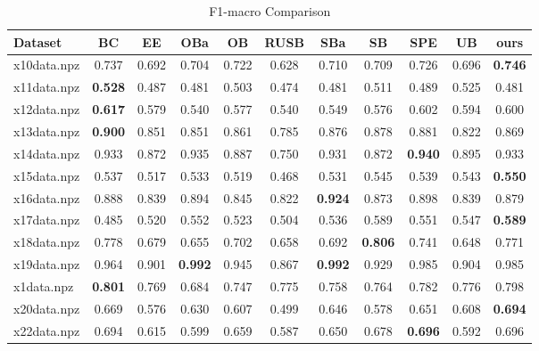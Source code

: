 \documentclass{article}
\begin{document}
\begin{table}[htbp]
\centering
\caption{F1-macro Comparison}
\begin{adjustbox}{width=\textwidth}
\label{tab:f1_macro_comparison}
\begin{tabular}{lcccccccccc}
\hline
\textbf{Dataset} & \textbf{BC} & \textbf{EE} & \textbf{OBa} & \textbf{OB} & \textbf{RUSB} & \textbf{SBa} & \textbf{SB} & \textbf{SPE} & \textbf{UB} & \textbf{ours} \\
\hline
x10data.npz & 0.737 & 0.692 & 0.704 & 0.722 & 0.628 & 0.710 & 0.709 & 0.726 & 0.696 & \cellcolor{graybg}\textbf{0.746} \\
x11data.npz & \cellcolor{graybg}\textbf{0.528} & 0.487 & 0.481 & 0.503 & 0.474 & 0.481 & 0.511 & 0.489 & 0.525 & 0.481 \\
x12data.npz & \cellcolor{graybg}\textbf{0.617} & 0.579 & 0.540 & 0.577 & 0.540 & 0.549 & 0.576 & 0.602 & 0.594 & 0.600 \\
x13data.npz & \cellcolor{graybg}\textbf{0.900} & 0.851 & 0.851 & 0.861 & 0.785 & 0.876 & 0.878 & 0.881 & 0.822 & 0.869 \\
x14data.npz & 0.933 & 0.872 & 0.935 & 0.887 & 0.750 & 0.931 & 0.872 & \cellcolor{graybg}\textbf{0.940} & 0.895 & 0.933 \\
x15data.npz & 0.537 & 0.517 & 0.533 & 0.519 & 0.468 & 0.531 & 0.545 & 0.539 & 0.543 & \cellcolor{graybg}\textbf{0.550} \\
x16data.npz & 0.888 & 0.839 & 0.894 & 0.845 & 0.822 & \cellcolor{graybg}\textbf{0.924} & 0.873 & 0.898 & 0.839 & 0.879 \\
x17data.npz & 0.485 & 0.520 & 0.552 & 0.523 & 0.504 & 0.536 & 0.589 & 0.551 & 0.547 & \cellcolor{graybg}\textbf{0.589} \\
x18data.npz & 0.778 & 0.679 & 0.655 & 0.702 & 0.658 & 0.692 & \cellcolor{graybg}\textbf{0.806} & 0.741 & 0.648 & 0.771 \\
x19data.npz & 0.964 & 0.901 & \cellcolor{graybg}\textbf{0.992} & 0.945 & 0.867 & \cellcolor{graybg}\textbf{0.992} & 0.929 & 0.985 & 0.904 & 0.985 \\
x1data.npz & \cellcolor{graybg}\textbf{0.801} & 0.769 & 0.684 & 0.747 & 0.775 & 0.758 & 0.764 & 0.782 & 0.776 & 0.798 \\
x20data.npz & 0.669 & 0.576 & 0.630 & 0.607 & 0.499 & 0.646 & 0.578 & 0.651 & 0.608 & \cellcolor{graybg}\textbf{0.694} \\
x22data.npz & 0.694 & 0.615 & 0.599 & 0.659 & 0.587 & 0.650 & 0.678 & \cellcolor{graybg}\textbf{0.696} & 0.592 & 0.696 \\

\end{tabular}
\end{adjustbox}
\end{table}
\end{document}
